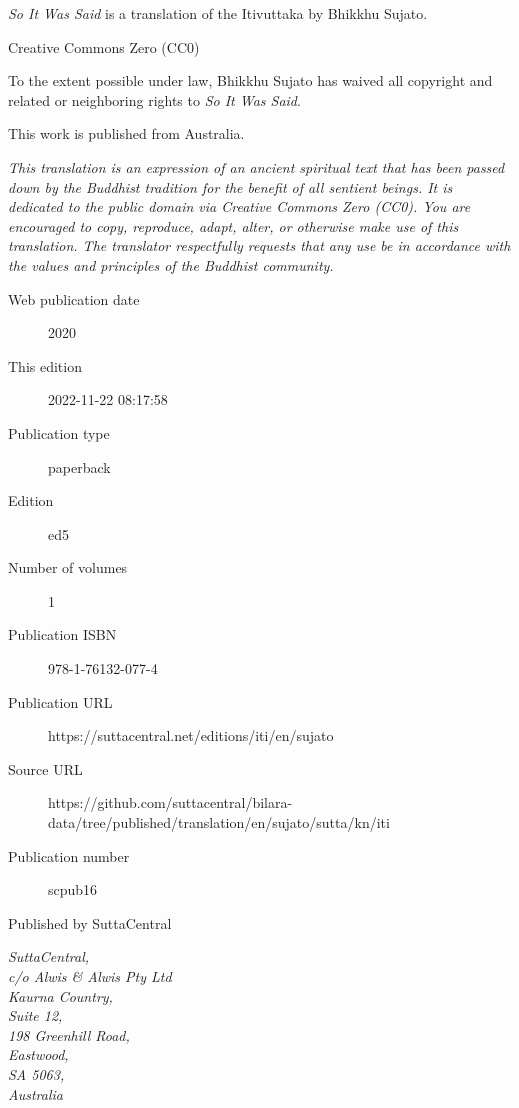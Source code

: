 \documentclass[12pt,openany]{book}%
\begin{document}
\begin{footnotesize}

\textit{So It Was Said} is a translation of the Itivuttaka by Bhikkhu Sujato.

\medskip

Creative Commons Zero (CC0)

To the extent possible under law, Bhikkhu Sujato has waived all copyright and related or neighboring rights to \textit{So It Was Said}.

\medskip

This work is published from Australia.

\begin{center}
\textit{This translation is an expression of an ancient spiritual text that has been passed down by the Buddhist tradition for the benefit of all sentient beings. It is dedicated to the public domain via Creative Commons Zero (CC0). You are encouraged to copy, reproduce, adapt, alter, or otherwise make use of this translation. The translator respectfully requests that any use be in accordance with the values and principles of the Buddhist community.}
\end{center}

\medskip

\begin{description}
    \item[Web publication date] 2020
    \item[This edition] 2022-11-22 08:17:58
    \item[Publication type] paperback
    \item[Edition] ed5
    \item[Number of volumes] 1
    \item[Publication ISBN] 978-1-76132-077-4
    \item[Publication URL] https://suttacentral.net/editions/iti/en/sujato
    \item[Source URL] https://github.com/suttacentral/bilara-data/tree/published/translation/en/sujato/sutta/kn/iti
    \item[Publication number] scpub16
\end{description}

\medskip

Published by SuttaCentral

\medskip

\textit{SuttaCentral,\\
c/o Alwis \& Alwis Pty Ltd\\
Kaurna Country,\\
Suite 12,\\
198 Greenhill Road,\\
Eastwood,\\
SA 5063,\\
Australia}

\end{footnotesize}
\end{document}
